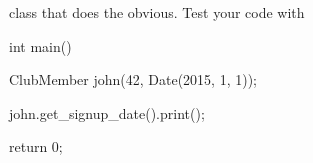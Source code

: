 class that does the obvious. Test your code with

\begin{console}

int main()

{   

    ClubMember john(42, Date(2015, 1, 1));

    john.get_signup_date().print();

    return 0;

}

\end{console}


